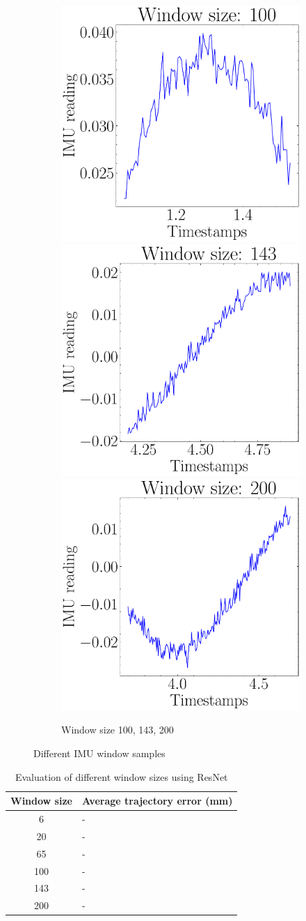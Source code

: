 \begin{figure}[H]
    \begin{subfigure}{\linewidth}
    \includegraphics[width=.3\linewidth]{images/fig_chapter4/imu_windows/imu_window_size_100.pdf}\hfill
    \includegraphics[width=.3\linewidth]{images/fig_chapter4/imu_windows/imu_window_size_143.pdf}\hfill
    \includegraphics[width=.3\linewidth]{images/fig_chapter4/imu_windows/imu_window_size_200.pdf}\hfill
    \caption{Window size 100, 143, 200}
    \end{subfigure}
\caption{Different IMU window samples}
\label{fig:imu_window_samples}
\end{figure}



\begin{table}[H]
    \centering
\begin{tabular}{|c|L|}
\hline
\textbf{Window size} & \textbf{Average trajectory error (mm)} \\
\hline

6 & - \\
20 & - \\
65 & - \\
100 & - \\
143 & - \\
200 & - \\
\hline
\end{tabular}
    \caption{Evaluation of different window sizes using ResNet}
    \label{tab:window_size_eval}
\end{table}


